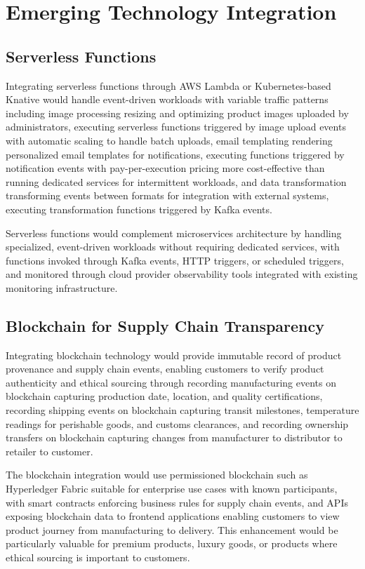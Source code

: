 \section{Emerging Technology Integration}

\subsection{Serverless Functions}

Integrating serverless functions through AWS Lambda or Kubernetes-based Knative would handle event-driven workloads with variable traffic patterns including image processing resizing and optimizing product images uploaded by administrators, executing serverless functions triggered by image upload events with automatic scaling to handle batch uploads, email templating rendering personalized email templates for notifications, executing functions triggered by notification events with pay-per-execution pricing more cost-effective than running dedicated services for intermittent workloads, and data transformation transforming events between formats for integration with external systems, executing transformation functions triggered by Kafka events.

Serverless functions would complement microservices architecture by handling specialized, event-driven workloads without requiring dedicated services, with functions invoked through Kafka events, HTTP triggers, or scheduled triggers, and monitored through cloud provider observability tools integrated with existing monitoring infrastructure.

\subsection{Blockchain for Supply Chain Transparency}

Integrating blockchain technology would provide immutable record of product provenance and supply chain events, enabling customers to verify product authenticity and ethical sourcing through recording manufacturing events on blockchain capturing production date, location, and quality certifications, recording shipping events on blockchain capturing transit milestones, temperature readings for perishable goods, and customs clearances, and recording ownership transfers on blockchain capturing changes from manufacturer to distributor to retailer to customer.

The blockchain integration would use permissioned blockchain such as Hyperledger Fabric suitable for enterprise use cases with known participants, with smart contracts enforcing business rules for supply chain events, and APIs exposing blockchain data to frontend applications enabling customers to view product journey from manufacturing to delivery. This enhancement would be particularly valuable for premium products, luxury goods, or products where ethical sourcing is important to customers.

